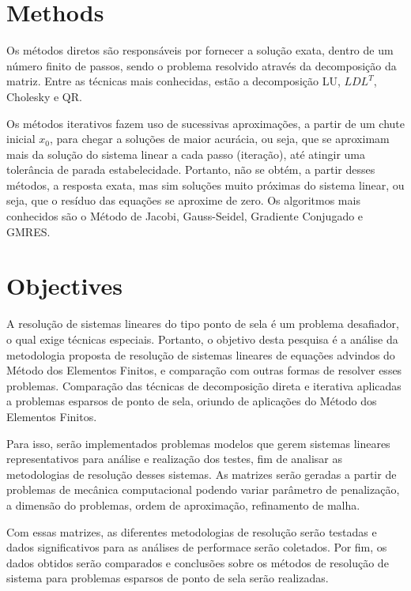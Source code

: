 \documentclass[12pt]{article}
\begin{document}
\section{Methods}

Os métodos diretos são responsáveis por fornecer a solução exata, dentro de um número finito de passos, sendo o problema resolvido através 
da decomposição da matriz. Entre as técnicas mais conhecidas, estão a decomposição LU, \(LDL^T\), Cholesky e QR.

Os métodos iterativos fazem uso de sucessivas aproximações, a partir de um chute inicial \(x_0\), para chegar a soluções de maior acurácia, ou seja, 
que se aproximam mais da solução do sistema linear a cada passo (iteração), até atingir uma tolerância de parada estabelecidade. Portanto, não se obtém, 
a partir desses métodos, a resposta exata, mas sim soluções muito próximas do sistema linear, ou seja, que o resíduo das equações se aproxime de zero. 
Os algoritmos mais conhecidos são o Método de Jacobi, Gauss-Seidel, Gradiente Conjugado e GMRES.

\section{Objectives}

A resolução de sistemas lineares do tipo ponto de sela é um problema desafiador, o qual exige técnicas especiais. Portanto, o objetivo
desta pesquisa é a análise da metodologia proposta de resolução de sistemas lineares de equações advindos do Método dos Elementos Finitos, 
e comparação com outras formas de resolver esses problemas. Comparação das técnicas de decomposição direta e iterativa aplicadas a 
problemas esparsos de ponto de sela, oriundo de aplicações do Método dos Elementos Finitos. 



Para isso, serão implementados problemas modelos que gerem sistemas lineares representativos para análise e realização dos testes, fim de 
analisar as metodologias de resolução desses sistemas. As matrizes serão geradas a partir de problemas de mecânica computacional 
podendo variar parâmetro de penalização, a dimensão do problemas, ordem de aproximação, refinamento de malha. 

Com essas matrizes, as diferentes metodologias de resolução serão testadas e dados significativos para as análises de performace serão coletados.
Por fim, os dados obtidos serão comparados e conclusões sobre os métodos de resolução de sistema para problemas esparsos de ponto de sela serão 
realizadas.
\end{document}
